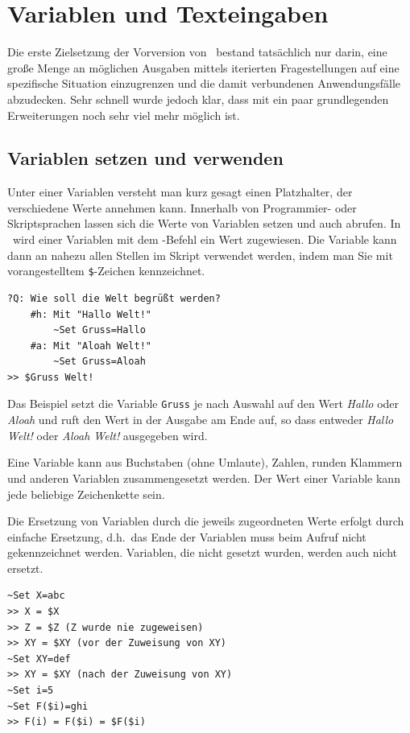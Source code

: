 \chapter{Variablen und Texteingaben}
Die erste Zielsetzung der Vorversion von \FPZ\ bestand tatsächlich nur darin, eine große Menge an möglichen Ausgaben mittels iterierten Fragestellungen auf eine spezifische Situation einzugrenzen und die damit verbundenen Anwendungsfälle abzudecken. Sehr schnell wurde jedoch klar, dass mit ein paar grundlegenden Erweiterungen noch sehr viel mehr möglich ist.

\section{Variablen setzen und verwenden}\label{VariablenSetzenUndVerwenden}
Unter einer Variablen versteht man kurz gesagt einen Platzhalter, der verschiedene Werte annehmen kann. Innerhalb von Programmier- oder Skriptsprachen lassen sich die Werte von Variablen setzen und auch abrufen. In \FPZ\ wird einer Variablen mit dem -Befehl ein Wert zugewiesen. Die Variable kann dann an nahezu allen Stellen im Skript verwendet werden, indem man Sie mit vorangestelltem \verb|$|-Zeichen kennzeichnet.

\label{BspHalloWeltMitVariable}
\begin{verbatim}
?Q: Wie soll die Welt begrüßt werden?
    #h: Mit "Hallo Welt!"
        ~Set Gruss=Hallo
    #a: Mit "Aloah Welt!"
        ~Set Gruss=Aloah
>> $Gruss Welt!
\end{verbatim}

Das Beispiel setzt  die Variable \verb|Gruss| je nach Auswahl auf den Wert \emph{Hallo} oder \emph{Aloah} und ruft den Wert in der Ausgabe am Ende auf, so dass entweder \emph{Hallo Welt!} oder \emph{Aloah Welt!} ausgegeben wird.

Eine Variable kann aus Buchstaben (ohne Umlaute), Zahlen, runden Klammern und anderen Variablen zusammengesetzt werden. Der Wert einer Variable kann jede beliebige Zeichenkette sein. 

Die Ersetzung von Variablen durch die jeweils zugeordneten Werte erfolgt durch einfache Ersetzung, d.h.\ das Ende der Variablen muss beim Aufruf nicht gekennzeichnet werden. Variablen, die nicht gesetzt wurden, werden auch nicht ersetzt.

\label{BspVariablenersetzung}
\begin{verbatim}
~Set X=abc
>> X = $X
>> Z = $Z (Z wurde nie zugeweisen)
>> XY = $XY (vor der Zuweisung von XY)
~Set XY=def
>> XY = $XY (nach der Zuweisung von XY)
~Set i=5
~Set F($i)=ghi
>> F(i) = F($i) = $F($i)
\end{verbatim}

